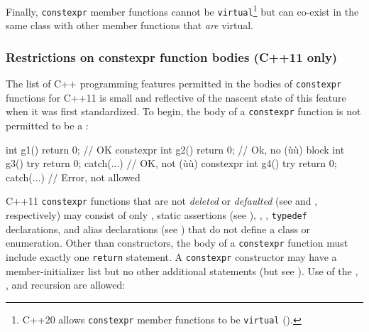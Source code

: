 Finally, \lstinline!constexpr! member functions cannot be
\lstinline!virtual!{\cprotect\footnote{C++20 allows \lstinline!constexpr!
member functions to be \lstinline!virtual! (\cite{dimov18}).}} but can co-exist in the same class with
other member functions that \emph{are} virtual.

\subsubsection[Restrictions on \lstinline!constexpr! function bodies (C++11 only)]{Restrictions on {\SubsubsecCode constexpr} function bodies (C++11 only)}\label{restrictions-on-constexpr-function-bodies-(c++11-only)}

The list of C++ programming features permitted in the bodies of
\lstinline!constexpr! functions for C++11 is small and reflective of the
nascent state of this feature when it was first standardized. To begin,
the body of a \lstinline!constexpr! function is not permitted to be a
:

\begin{emcppslisting}
          int g1()     { return 0; }                // OK
constexpr int g2()     { return 0; }                // Ok, no (ù{}ù) block
          int g3() try { return 0; } catch(...) {}  // OK, not (ù{}ù)
constexpr int g4() try { return 0; } catch(...) {}  // Error, not allowed
\end{emcppslisting}


\noindent C++11 \lstinline!constexpr! functions that are not \emph{deleted} or
\emph{defaulted} (see  and
, respectively) may consist of only
, static assertions (see ), ,
, \lstinline!typedef! declarations, and
alias declarations (see ) that do not
define a class or enumeration. Other than constructors, the body of a
\lstinline!constexpr! function must include exactly one \lstinline!return!
statement. A \lstinline!constexpr! constructor may have a
member-initializer list but no other additional statements (but see
). Use of the
, , and recursion are
allowed:

